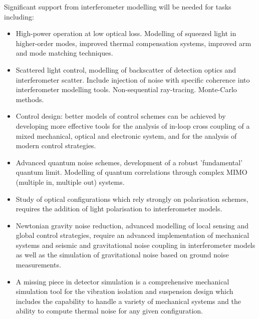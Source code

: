 Significant support from interferometer modelling will be needed for tasks including:
\begin{itemize}
\item High-power operation at low optical loss.
Modelling of squeezed light in higher-order modes, improved thermal compensation systems, improved arm and mode matching techniques.
\item Scattered light control, modelling of backscatter of detection optics and interferometer scatter. Include injection of noise with specific coherence into interferometer modelling tools. Non-sequential ray-tracing. Monte-Carlo methods.
\item Control design: better models of control schemes can be achieved by developing more effective tools for the analysis of in-loop cross coupling of a mixed mechanical, optical and electronic system, and for the analysis of modern
control strategies.
\item Advanced quantum noise schemes, development of a robust 'fundamental' quantum limit. Modelling of quantum correlations through complex MIMO (multiple in, multiple out) systems.
\item Study of optical configurations which rely strongly on polarisation schemes, requires the addition of light polarisation to interferometer models.
\item Newtonian gravity noise reduction, advanced modelling of local sensing and global control strategies, require an advanced implementation of mechanical systems and seismic and gravitational noise coupling in interferometer models as well as the simulation of gravitational noise based on ground noise measurements.
\item A missing piece in detector simulation is a comprehensive mechanical simulation tool for the vibration isolation and suspension design which includes the capability to handle a variety of mechanical systems and the ability to compute thermal noise for any given configuration.
\end{itemize}

